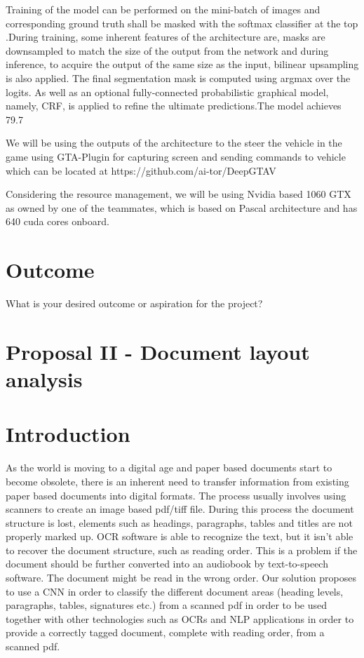 \documentclass[10pt,twocolumn,letterpaper]{article}
\begin{document}
Training of the model can be performed on the mini-batch of images and corresponding ground truth shall be masked with the softmax classifier at the top .During training, some inherent features of the architecture are, masks are downsampled to match the size of the output from the network and during inference, to acquire the output of the same size as the input, bilinear upsampling is also applied. The final segmentation mask is computed using argmax over the logits. As well as an optional fully-connected probabilistic graphical model, namely, CRF, is applied to refine the ultimate predictions.The model achieves 79.7%

We will be using the outputs of the architecture to the steer the vehicle in the game using GTA-Plugin for capturing screen and sending commands to vehicle which can be located at https://github.com/ai-tor/DeepGTAV

Considering the resource management, we will be using Nvidia based 1060 GTX as owned by one of the teammates, which is based on Pascal architecture and has 640 cuda cores onboard.

\section{Outcome}
    What is your desired outcome or aspiration for the project?

%
%
\section*{Proposal II - Document layout analysis}
\setcounter{section}{0}

\section{Introduction}
As the world is moving to a digital age and paper based documents start to become obsolete, there is an inherent need to transfer information from existing paper based documents into digital formats. The process usually involves using scanners to create an image based pdf/tiff file. During this process the document structure is lost, elements such as headings, paragraphs, tables and titles are not properly marked up. OCR software is able to recognize the text, but it isn't able to recover the document structure, such as reading order. This is a problem if the document should be further converted into an audiobook by text-to-speech software. The document might be read in the wrong order. Our solution proposes to use a CNN in order to classify the different document areas (heading levels, paragraphs, tables, signatures etc.) from a scanned pdf in order to be used together with other technologies such as OCRs and NLP applications in order to provide a correctly tagged document, complete with reading order, from a scanned pdf.
\end{document}
